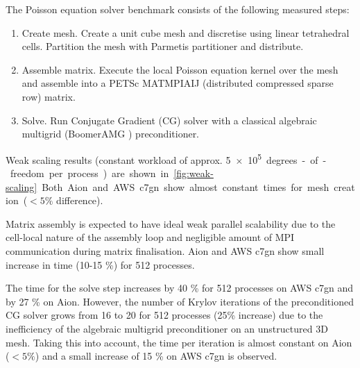 The Poisson equation solver benchmark consists of the following measured steps:
\begin{enumerate}
    \item Create mesh. Create a unit cube mesh and discretise using linear
    tetrahedral cells. Partition the mesh with Parmetis partitioner
    \citep{Karypis1998} and distribute.
    \item Assemble matrix. Execute the local Poisson equation kernel over the
    mesh and assemble into a PETSc MATMPIAIJ (distributed compressed sparse row)
    matrix.
    \item Solve. Run Conjugate Gradient (CG) solver with a classical algebraic
    multigrid (BoomerAMG \citep{hypre}) preconditioner.
\end{enumerate}
%
Weak scaling results (constant workload of approx. \SI{5e+5} degrees-of-freedom
per process) are shown in \autoref{fig:weak-scaling}. Both Aion and AWS c7gn
show almost constant times for mesh creation ($< 5\%$ difference).

Matrix assembly is expected to have ideal weak parallel scalability due to the
cell-local nature of the assembly loop and negligible amount of MPI
communication during matrix finalisation. Aion and AWS c7gn show small increase
in time (10-15 \%) for 512 processes.

The time for the solve step increases by 40 \% for 512 processes on AWS c7gn and
by 27 \% on Aion. However, the number of Krylov iterations of the preconditioned
CG solver grows from 16 to 20 for 512 processes (25\% increase) due to the
inefficiency of the algebraic multigrid preconditioner on an unstructured 3D
mesh. Taking this into account, the time per iteration is almost constant on
Aion ($< 5\%$) and a small increase of 15 \% on AWS c7gn is observed.

